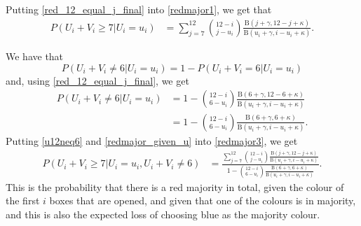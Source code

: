 Putting \eqref{red_12_equal_j_final} into \eqref{redmajor1}, we get that
\begin{equation}
\label{redmajor_given_u}
    \begin{aligned}
        P(U_i+V_i \geq 7 | U_i=u_i) 
        &= \sum_{j=7}^{12} \binom{12-i}{j-u_i} \frac{\text{B}(j+\gamma,12-j+\kappa)}{\text{B}(u_i+\gamma,i-u_i+\kappa)}.
    \end{aligned}
\end{equation}

We have that
\begin{equation*}
    P(U_i+V_i\neq6|U_i=u_i) 
        = 1-P(U_i+V_i=6|U_i=u_i)
\end{equation*}
and, using \eqref{red_12_equal_j_final}, we get 
\begin{equation}
\label{u12neq6}
    \begin{aligned}
        P(U_i+V_i\neq6|U_i=u_i) 
        &= 1-\binom{12-i}{6-u_i} \frac{\text{B}(6+\gamma,12-6+\kappa)}{\text{B}(u_i+\gamma,i-u_i+\kappa)}\\[6pt]
        &= 1-\binom{12-i}{6-u_i} \frac{\text{B}(6+\gamma,6+\kappa)}{\text{B}(u_i+\gamma,i-u_i+\kappa)}.
    \end{aligned}
\end{equation}
Putting \eqref{u12neq6} and \eqref{redmajor_given_u} into \eqref{redmajor3}, we get
\begin{equation}
\label{redmajor_final}
    \begin{aligned}
        P(U_i+V_i \geq 7 | U_i=u_i,U_i+V_i \neq 6) 
        &= \frac{\sum_{j=7}^{12} \binom{12-i}{j-u_i} \frac{\text{B}(j+\gamma,12-j+\kappa)}{\text{B}(u_i+\gamma,i-u_i+\kappa)}}{1-\binom{12-i}{6-u_i} \frac{\text{B}(6+\gamma,6+\kappa)}{\text{B}(u_i+\gamma,i-u_i+\kappa)}}.
    \end{aligned}
\end{equation}
This is the probability that there is a red majority in total, given the colour of the first $i$ boxes that are opened, and given that one of the colours is in majority, and this is also the expected loss of choosing blue as the majority colour. 


